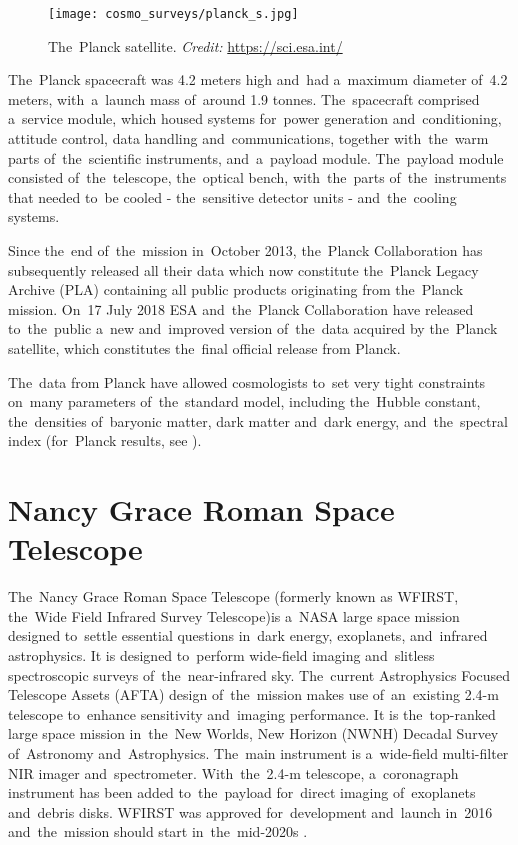 \begin{figure}[htb]
    \centering
    \texttt{[image: cosmo\_surveys/planck\_s.jpg]}
    \caption{The~Planck satellite. \textit{Credit:} \url{https://sci.esa.int/}}
    \label{fig:planck}
\end{figure}
The~Planck spacecraft was 4.2 meters high and~had a~maximum diameter of~4.2 meters, with~a~launch mass of~around 1.9 tonnes. The~spacecraft comprised a~service module, which housed systems for~power generation and~conditioning, attitude control, data handling and~communications, together with~the~warm parts of~the~scientific instruments, and~a~payload module. The~payload module consisted of~the~telescope, the~optical bench, with~the~parts of~the~instruments that needed to~be cooled - the~sensitive detector units - and~the~cooling systems.

Since the~end of~the~mission in~October 2013, the~Planck Collaboration has subsequently released all their data which now constitute the~Planck Legacy Archive (PLA) containing all public products originating from the~Planck mission. On~17 July 2018 ESA and~the~Planck Collaboration have released to~the~public a~new and~improved version of~the~data acquired by the~Planck satellite, which constitutes the~final official release from Planck.

The~data from Planck have allowed cosmologists to~set very tight constraints on~many parameters of~the~standard model, including the~Hubble constant, the~densities of~baryonic matter, dark matter and~dark energy, and~the~spectral index (for~Planck results, see \cite{planck_cosm}).
\section{Nancy Grace Roman Space Telescope}
The~Nancy Grace Roman Space Telescope (formerly known as WFIRST, the~Wide Field Infrared Survey Telescope)is a~NASA large space mission designed to~settle essential questions in~dark energy, exoplanets, and~infrared astrophysics. It is designed to~perform wide-field imaging and~slitless spectroscopic surveys of~the~near-infrared sky. The~current Astrophysics Focused Telescope Assets (AFTA) design of~the~mission makes use of~an~existing 2.4-m telescope to~enhance sensitivity and~imaging performance. It is the~top-ranked large space mission in~the~New Worlds, New Horizon (NWNH) Decadal Survey of~Astronomy and~Astrophysics. The~main instrument is a~wide-field multi-filter NIR imager and~spectrometer. With~the~2.4-m telescope, a~coronagraph instrument has been added to~the~payload for~direct imaging of~exoplanets and~debris disks. WFIRST was approved for~development and~launch in~2016 and~the~mission should start in~the~mid-2020s \cite{WFIRST_report}.

